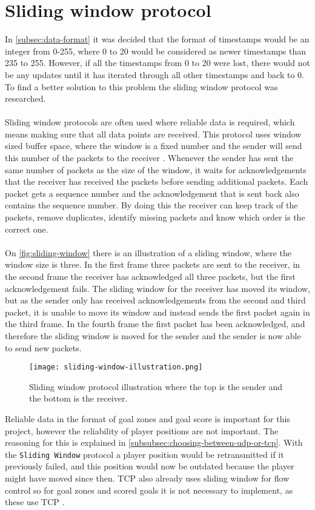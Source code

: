 \section{Sliding window protocol}
In \autoref{subsec:data-format} it was decided that the format of timestamps would be an integer from 0-255, where 0 to 20 would be considered as newer timestamps than 235 to 255.
However, if all the timestamps from 0 to 20 were lost, there would not be any updates until it has iterated through all other timestamps and back to 0.
To find a better solution to this problem the sliding window protocol was researched.
\\\\
Sliding window protocols are often used where reliable data is required, which means making sure that all data points are received.
This protocol uses window sized buffer space, where the window is a fixed number and the sender will send this number of the packets to the receiver \cite{design-and-validation-of-computer-protocols}.
Whenever the sender has sent the same number of packets as the size of the window, it waits for acknowledgements that the receiver has received the packets before sending additional packets.
Each packet gets a sequence number and the acknowledgement that is sent back also contains the sequence number.
By doing this the receiver can keep track of the packets, remove duplicates, identify missing packets and know which order is the correct one.
\\\\
On \autoref{fig:sliding-window} there is an illustration of a sliding window, where the window size is three.
In the first frame three packets are sent to the receiver, in the second frame the receiver has acknowledged all three packets, but the first acknowledgement fails.
The sliding window for the receiver has moved its window, but as the sender only has received acknowledgements from the second and third packet, it is unable to move its window and instead sends the first packet again in the third frame.
In the fourth frame the first packet has been acknowledged, and therefore the sliding window is moved for the sender and the sender is now able to send new packets.
\begin{figure}[H]
    \centering
    \texttt{[image: sliding-window-illustration.png]}
    \caption{Sliding window protocol illustration where the top is the sender and the bottom is the receiver.}
    \label{fig:sliding-window}
\end{figure}
\noindent
Reliable data in the format of goal zones and goal score is important for this project, however the reliability of player positions are not important.
The reasoning for this is explained in \autoref{subsubsec:choosing-between-udp-or-tcp}.
With the \texttt{Sliding Window} protocol a player position would be retransmitted if it previously failed, and this position would now be outdated because the player might have moved since then.
TCP also already uses sliding window for flow control so for goal zones and scored goals it is not necessary to implement, as these use TCP \cite{ibm:sliding-window}.

